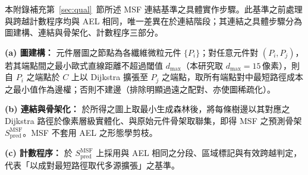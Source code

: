 
\label{app:msf}

本附錄補充第~\ref{sec:qual}~節所述 MSF 連結基準之具體實作步驟。此基準之前處理與跨越計數程序均與 AEL 相同，唯一差異在於連結階段；其連結之具體步驟分為圖建構、連結與骨架化、計數程序三部分。

\textbf{(a) 圖建構：} 元件層圖之節點為各纖維微粒元件 $\{P_i\}$；對任意元件對 $(P_i, P_j)$，若其端點間之最小歐式直線距離不超過閾值 $d_{\max}$（本研究取 $d_{\max} = 15\,\text{像素}$），則自 $P_i$ 之端點於 $C$ 上以 Dijkstra 擴張至 $P_j$ 之端點，取所有端點對中最短路徑成本之最小值作為邊權；否則不建邊（排除明顯過遠之配對、亦使圖稀疏化）。

\textbf{(b) 連結與骨架化：} 於所得之圖上取最小生成森林後，將每條樹邊以其對應之 Dijkstra 路徑於像素層級實體化、與原始元件骨架取聯集，即得 MSF 之預測骨架 $S_{\text{pred}}^{\text{MSF}}$。MSF 不套用 AEL 之形態學剪枝。

\textbf{(c) 計數程序：} 於 $S_{\text{pred}}^{\text{MSF}}$ 上採用與 AEL 相同之分段、區域標記與有效跨越判定，代表「以成對最短路徑取代多源擴張」之基準。
